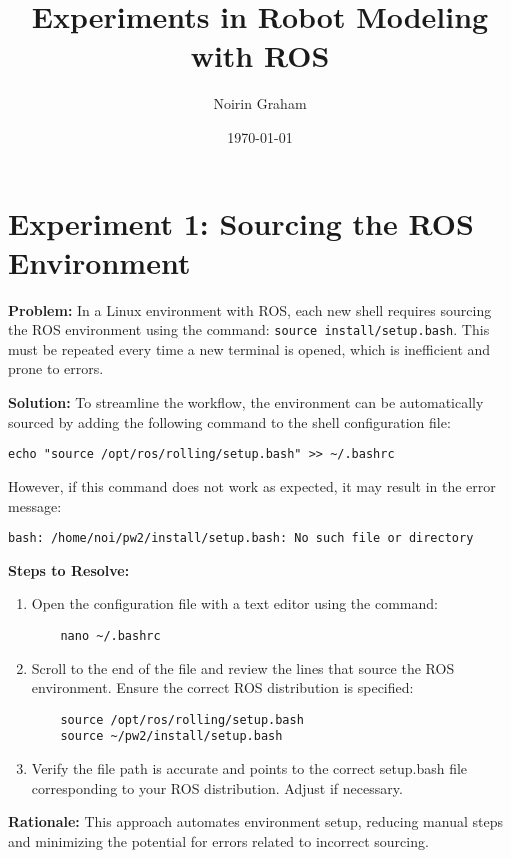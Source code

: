 \documentclass{article}
\title{Experiments in Robot Modeling with ROS}
\author{Noirin Graham}
\date{\today}
\begin{document}
\maketitle

\section*{Experiment 1: Sourcing the ROS Environment}

\begin{problembox}
\textbf{Problem:} In a Linux environment with ROS, each new shell requires sourcing the ROS environment using the command: \texttt{source install/setup.bash}. This must be repeated every time a new terminal is opened, which is inefficient and prone to errors.
\end{problembox}

\begin{solutionbox}
\textbf{Solution:} To streamline the workflow, the environment can be automatically sourced by adding the following command to the shell configuration file:

\begin{verbatim}
echo "source /opt/ros/rolling/setup.bash" >> ~/.bashrc
\end{verbatim}

However, if this command does not work as expected, it may result in the error message:

\begin{verbatim}
bash: /home/noi/pw2/install/setup.bash: No such file or directory
\end{verbatim}

\textbf{Steps to Resolve:}
\begin{enumerate}
    \item Open the configuration file with a text editor using the command:
    \begin{verbatim}
    nano ~/.bashrc
    \end{verbatim}
    \item Scroll to the end of the file and review the lines that source the ROS environment. Ensure the correct ROS distribution is specified:
    \begin{verbatim}
    source /opt/ros/rolling/setup.bash
    source ~/pw2/install/setup.bash
    \end{verbatim}
    \item Verify the file path is accurate and points to the correct setup.bash file corresponding to your ROS distribution. Adjust if necessary.
\end{enumerate}

\textbf{Rationale:} This approach automates environment setup, reducing manual steps and minimizing the potential for errors related to incorrect sourcing.
\end{solutionbox}
\end{document}
